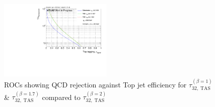 \begin{figure}[H]
\includegraphics[width=0.48\textwidth]{sascha_input/Appendix/Top_best/ROC_ALL_h_recoJet_nSub32_2_bin6.pdf}
\caption{{ROCs showing QCD rejection against Top jet efficiency for $\tau_{32,\;\text{TAS}}^{(\beta=1)}$ \& $\tau_{32,\;\text{TAS}}^{(\beta=1.7)}$ compared to $\tau_{32,\;\text{TAS}}^{(\beta=2)}$}}
\end{figure}\label{fig:ROC_best_top}



